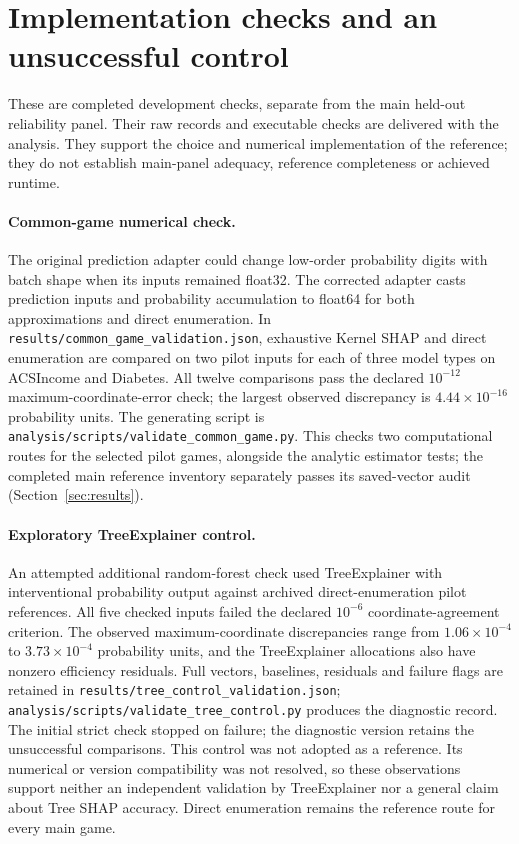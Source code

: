 \section{Implementation checks and an unsuccessful control}
\label{app:implementation-checks}

These are completed development checks, separate from the main held-out reliability panel. Their raw records and executable checks are delivered with the analysis. They support the choice and numerical implementation of the reference; they do not establish main-panel adequacy, reference completeness or achieved runtime.

\paragraph{Common-game numerical check.}
The original prediction adapter could change low-order probability digits with batch shape when its inputs remained float32. The corrected adapter casts prediction inputs and probability accumulation to float64 for both approximations and direct enumeration. In \texttt{results/common\_game\_validation.json}, exhaustive Kernel SHAP and direct enumeration are compared on two pilot inputs for each of three model types on ACSIncome and Diabetes. All twelve comparisons pass the declared $10^{-12}$ maximum-coordinate-error check; the largest observed discrepancy is $4.44\times10^{-16}$ probability units. The generating script is \texttt{analysis/scripts/validate\_common\_game.py}. This checks two computational routes for the selected pilot games, alongside the analytic estimator tests; the completed main reference inventory separately passes its saved-vector audit (Section~\ref{sec:results}).

\paragraph{Exploratory TreeExplainer control.}
An attempted additional random-forest check used TreeExplainer with interventional probability output against archived direct-enumeration pilot references. All five checked inputs failed the declared $10^{-6}$ coordinate-agreement criterion. The observed maximum-coordinate discrepancies range from $1.06\times10^{-4}$ to $3.73\times10^{-4}$ probability units, and the TreeExplainer allocations also have nonzero efficiency residuals. Full vectors, baselines, residuals and failure flags are retained in \texttt{results/tree\_control\_validation.json}; \texttt{analysis/scripts/validate\_tree\_control.py} produces the diagnostic record. The initial strict check stopped on failure; the diagnostic version retains the unsuccessful comparisons. This control was not adopted as a reference. Its numerical or version compatibility was not resolved, so these observations support neither an independent validation by TreeExplainer nor a general claim about Tree SHAP accuracy. Direct enumeration remains the reference route for every main game.
